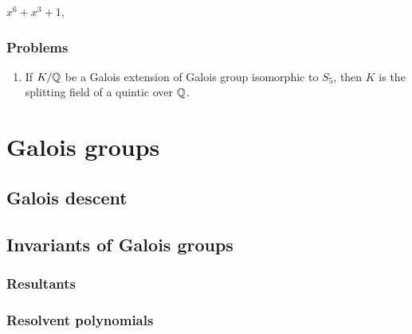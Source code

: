 \documentclass{../../large}
\begin{document}
$x^6+x^3+1$,



\section*{Problems}

\begin{enumerate}
\item If $K/\mathbb{Q}$ be a Galois extension of Galois group isomorphic to $S_5$, then $K$ is the splitting field of a quintic over $\mathbb{Q}$.
\end{enumerate}








\part{Galois groups}


\chapter{Galois descent}




\chapter{Invariants of Galois groups}

\section{Resultants}

\section{Resolvent polynomials}

\begin{prb}
\end{prb}
\begin{prb}
\end{prb}
\begin{prb}
\end{prb}
\begin{prb}
\end{prb}
\begin{prb}
\end{prb}
\end{document}
